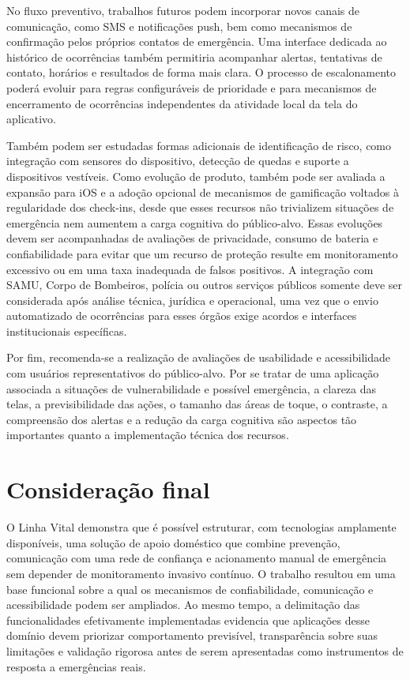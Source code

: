No fluxo preventivo, trabalhos futuros podem incorporar novos canais de comunicação, como SMS e notificações push, bem como mecanismos de confirmação pelos próprios contatos de emergência. Uma interface dedicada ao histórico de ocorrências também permitiria acompanhar alertas, tentativas de contato, horários e resultados de forma mais clara. O processo de escalonamento poderá evoluir para regras configuráveis de prioridade e para mecanismos de encerramento de ocorrências independentes da atividade local da tela do aplicativo.

Também podem ser estudadas formas adicionais de identificação de risco, como integração com sensores do dispositivo, detecção de quedas e suporte a dispositivos vestíveis. Como evolução de produto, também pode ser avaliada a expansão para iOS e a adoção opcional de mecanismos de gamificação voltados à regularidade dos check-ins, desde que esses recursos não trivializem situações de emergência nem aumentem a carga cognitiva do público-alvo. Essas evoluções devem ser acompanhadas de avaliações de privacidade, consumo de bateria e confiabilidade para evitar que um recurso de proteção resulte em monitoramento excessivo ou em uma taxa inadequada de falsos positivos. A integração com SAMU, Corpo de Bombeiros, polícia ou outros serviços públicos somente deve ser considerada após análise técnica, jurídica e operacional, uma vez que o envio automatizado de ocorrências para esses órgãos exige acordos e interfaces institucionais específicas.

Por fim, recomenda-se a realização de avaliações de usabilidade e acessibilidade com usuários representativos do público-alvo. Por se tratar de uma aplicação associada a situações de vulnerabilidade e possível emergência, a clareza das telas, a previsibilidade das ações, o tamanho das áreas de toque, o contraste, a compreensão dos alertas e a redução da carga cognitiva são aspectos tão importantes quanto a implementação técnica dos recursos.

\section{Consideração final}

O Linha Vital demonstra que é possível estruturar, com tecnologias amplamente disponíveis, uma solução de apoio doméstico que combine prevenção, comunicação com uma rede de confiança e acionamento manual de emergência sem depender de monitoramento invasivo contínuo. O trabalho resultou em uma base funcional sobre a qual os mecanismos de confiabilidade, comunicação e acessibilidade podem ser ampliados. Ao mesmo tempo, a delimitação das funcionalidades efetivamente implementadas evidencia que aplicações desse domínio devem priorizar comportamento previsível, transparência sobre suas limitações e validação rigorosa antes de serem apresentadas como instrumentos de resposta a emergências reais.
